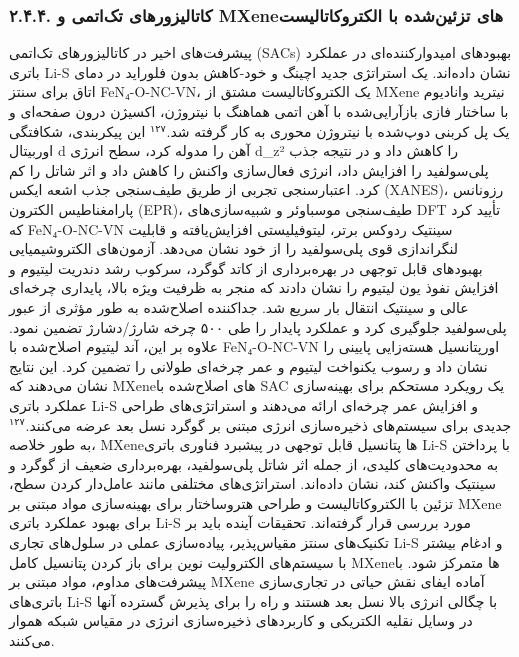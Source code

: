 \documentclass[12pt,a4paper,twocolumn]{article} %
\newcommand{\persian}[1]{\textfarsi{#1}}
\newcommand{\english}[1]{\textenglish{#1}}
\begin{document}
\subsubsection*{\persian{۲.۴.۴. کاتالیزورهای تک‌اتمی و \english{MXene}های تزئین‌شده با الکتروکاتالیست}}
\persian{
پیشرفت‌های اخیر در کاتالیزورهای تک‌اتمی (\english{SACs}) بهبودهای امیدوارکننده‌ای در عملکرد باتری \english{Li-S} نشان داده‌اند. یک استراتژی جدید اچینگ و خود-کاهش بدون فلوراید در دمای اتاق برای سنتز \english{FeN₄-O-NC-VN}، یک الکتروکاتالیست مشتق از \english{MXene} نیترید وانادیوم با ساختار فازی بازآرایی‌شده با آهن اتمی هماهنگ با نیتروژن، اکسیژن درون صفحه‌ای و یک پل کربنی دوپ‌شده با نیتروژن محوری به کار گرفته شد.$^{۱۲۷}$ این پیکربندی، شکافتگی اوربیتال \english{d} آهن را مدوله کرد، سطح انرژی \english{d_{z²}} را کاهش داد و در نتیجه جذب پلی‌سولفید را افزایش داد، انرژی فعال‌سازی واکنش را کاهش داد و اثر شاتل را کم کرد. اعتبارسنجی تجربی از طریق طیف‌سنجی جذب اشعه ایکس (\english{XANES})، رزونانس پارامغناطیس الکترون (\english{EPR})، طیف‌سنجی موسباوئر و شبیه‌سازی‌های \english{DFT} تأیید کرد که \english{FeN₄-O-NC-VN} سینتیک ردوکس برتر، لیتوفیلیستی افزایش‌یافته و قابلیت لنگراندازی قوی پلی‌سولفید را از خود نشان می‌دهد. آزمون‌های الکتروشیمیایی بهبودهای قابل توجهی در بهره‌برداری از کاتد گوگرد، سرکوب رشد دندریت لیتیوم و افزایش نفوذ یون لیتیوم را نشان دادند که منجر به ظرفیت ویژه بالا، پایداری چرخه‌ای عالی و سینتیک انتقال بار سریع شد. جداکننده اصلاح‌شده به طور مؤثری از عبور پلی‌سولفید جلوگیری کرد و عملکرد پایدار را طی ۵۰۰ چرخه شارژ/دشارژ تضمین نمود. علاوه بر این، آند لیتیوم اصلاح‌شده با \english{FeN₄-O-NC-VN} اورپتانسیل هسته‌زایی پایینی را نشان داد و رسوب یکنواخت لیتیوم و عمر چرخه‌ای طولانی را تضمین کرد. این نتایج نشان می‌دهند که \english{MXene}های اصلاح‌شده با \english{SAC} یک رویکرد مستحکم برای بهینه‌سازی عملکرد باتری \english{Li-S} و افزایش عمر چرخه‌ای ارائه می‌دهند و استراتژی‌های طراحی جدیدی برای سیستم‌های ذخیره‌سازی انرژی مبتنی بر گوگرد نسل بعد عرضه می‌کنند.$^{۱۲۷}$
}
\persian{
به طور خلاصه، \english{MXene}ها پتانسیل قابل توجهی در پیشبرد فناوری باتری \english{Li-S} با پرداختن به محدودیت‌های کلیدی، از جمله اثر شاتل پلی‌سولفید، بهره‌برداری ضعیف از گوگرد و سینتیک واکنش کند، نشان داده‌اند. استراتژی‌های مختلفی مانند عامل‌دار کردن سطح، تزئین با الکتروکاتالیست و طراحی هتروساختار برای بهینه‌سازی مواد مبتنی بر \english{MXene} برای بهبود عملکرد باتری \english{Li-S} مورد بررسی قرار گرفته‌اند. تحقیقات آینده باید بر تکنیک‌های سنتز مقیاس‌پذیر، پیاده‌سازی عملی در سلول‌های تجاری \english{Li-S} و ادغام بیشتر با سیستم‌های الکترولیت نوین برای باز کردن پتانسیل کامل \english{MXene}ها متمرکز شود. با پیشرفت‌های مداوم، مواد مبتنی بر \english{MXene} آماده ایفای نقش حیاتی در تجاری‌سازی باتری‌های \english{Li-S} با چگالی انرژی بالا نسل بعد هستند و راه را برای پذیرش گسترده آنها در وسایل نقلیه الکتریکی و کاربردهای ذخیره‌سازی انرژی در مقیاس شبکه هموار می‌کنند.
}
\end{document}
